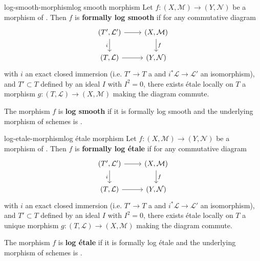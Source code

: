 \begin{topic}{log-smooth-morphism}{log smooth morphism}
    Let $f : (X, \mathcal{M}) \to (Y, \mathcal{N})$ be a morphism of  . Then $f$ is \textbf{formally log smooth} if for any commutative diagram
    \[ \begin{tikzcd} (T', \mathcal{L}') \arrow{r} \arrow[swap]{d}{i} & (X, \mathcal{M}) \arrow{d}{f} \\ (T, \mathcal{L}) \arrow{r} & (Y, \mathcal{N}) \end{tikzcd} \]
    with $i$ an exact closed immersion (i.e. $T' \to T$ a  and $i^* \mathcal{L} \to \mathcal{L}'$ an isomorphism), and $T' \subset T$ defined by an ideal $I$ with $I^2 = 0$, there exists étale locally on $T$ a morphism $g : (T, \mathcal{L}) \to (X, \mathcal{M})$ making the diagram commute.
    
    The morphism $f$ is \textbf{log smooth} if it is formally log smooth and the underlying morphism of schemes is .
\end{topic}

\begin{topic}{log-etale-morphism}{log étale morphism}
    Let $f : (X, \mathcal{M}) \to (Y, \mathcal{N})$ be a morphism of  . Then $f$ is \textbf{formally log étale} if for any commutative diagram
    \[ \begin{tikzcd} (T', \mathcal{L}') \arrow{r} \arrow[swap]{d}{i} & (X, \mathcal{M}) \arrow{d}{f} \\ (T, \mathcal{L}) \arrow{r} & (Y, \mathcal{N}) \end{tikzcd} \]
    with $i$ an exact closed immersion (i.e. $T' \to T$ a  and $i^* \mathcal{L} \to \mathcal{L}'$ an isomorphism), and $T' \subset T$ defined by an ideal $I$ with $I^2 = 0$, there exists étale locally on $T$ a unique morphism $g : (T, \mathcal{L}) \to (X, \mathcal{M})$ making the diagram commute.
    
    The morphism $f$ is \textbf{log étale} if it is formally log étale and the underlying morphism of schemes is .
\end{topic}


